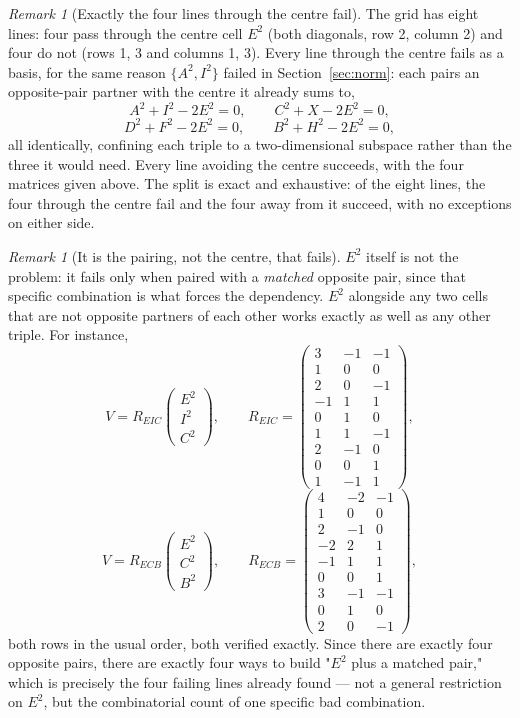 \documentclass[12pt]{article}
\theoremstyle{remark}
\newtheorem{remark}[theorem]{Remark}
\begin{document}
\begin{remark}[Exactly the four lines through the centre fail]
The grid has eight lines: four pass through the centre cell $E^2$
(both diagonals, row 2, column 2) and four do not (rows 1, 3 and
columns 1, 3). Every line through the centre fails as a basis, for
the same reason $\{A^2,I^2\}$ failed in Section~\ref{sec:norm}: each
pairs an opposite-pair partner with the centre it already sums to,
\[
A^2+I^2-2E^2 = 0, \qquad C^2+X-2E^2 = 0,
\]
\[
D^2+F^2-2E^2 = 0, \qquad B^2+H^2-2E^2 = 0,
\]
all identically, confining each triple to a two-dimensional subspace
rather than the three it would need. Every line avoiding the centre
succeeds, with the four matrices given above. The split is exact and
exhaustive: of the eight lines, the four through the centre fail and
the four away from it succeed, with no exceptions on either side.
\end{remark}

\begin{remark}[It is the pairing, not the centre, that fails]
$E^2$ itself is not the problem: it fails only when paired with a
\emph{matched} opposite pair, since that specific combination is what
forces the dependency. $E^2$ alongside any two cells that are not
opposite partners of each other works exactly as well as any other
triple. For instance,
\[
V = R_{EIC} \begin{pmatrix} E^2 \\ I^2 \\ C^2 \end{pmatrix} , \qquad
R_{EIC} =
\begin{pmatrix}
3&-1&-1\\ 1&0&0\\ 2&0&-1\\ -1&1&1\\ 0&1&0\\ 1&1&-1\\
2&-1&0\\ 0&0&1\\ 1&-1&1
\end{pmatrix} ,
\]
\[
V = R_{ECB} \begin{pmatrix} E^2 \\ C^2 \\ B^2 \end{pmatrix} , \qquad
R_{ECB} =
\begin{pmatrix}
4&-2&-1\\ 1&0&0\\ 2&-1&0\\ -2&2&1\\ -1&1&1\\ 0&0&1\\
3&-1&-1\\ 0&1&0\\ 2&0&-1
\end{pmatrix} ,
\]
both rows in the usual order, both verified exactly. Since there are
exactly four opposite pairs, there are exactly four ways to build
"$E^2$ plus a matched pair," which is precisely the four failing
lines already found --- not a general restriction on $E^2$, but the
combinatorial count of one specific bad combination.
\end{remark}
\end{document}
